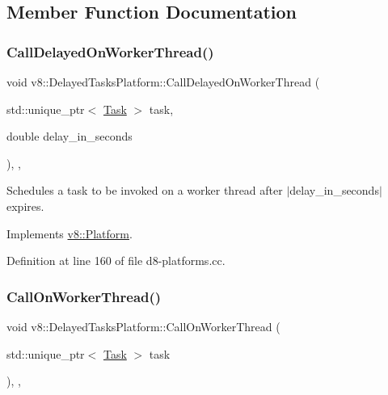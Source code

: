 \subsection{Member Function Documentation}
\mbox{\label{classv8_1_1DelayedTasksPlatform_aeb214faee105e6335c5a93601cac54c7}} 
\subsubsection{\texorpdfstring{Call\+Delayed\+On\+Worker\+Thread()}{CallDelayedOnWorkerThread()}}
{\footnotesize\ttfamily void v8\+::\+Delayed\+Tasks\+Platform\+::\+Call\+Delayed\+On\+Worker\+Thread (\begin{DoxyParamCaption}\item[{std\+::unique\+\_\+ptr$<$ \mbox{\hyperlink{classv8_1_1Task}{Task}} $>$}]{task,  }\item[{double}]{delay\+\_\+in\+\_\+seconds }\end{DoxyParamCaption})\hspace{0.3cm}{\ttfamily [inline]}, {\ttfamily [override]}, {\ttfamily [virtual]}}

Schedules a task to be invoked on a worker thread after $\vert$delay\+\_\+in\+\_\+seconds$\vert$ expires. 

Implements \mbox{\hyperlink{classv8_1_1Platform_a808b0e55ed3efca10ebca031bbd6ecc6}{v8\+::\+Platform}}.



Definition at line 160 of file d8-\/platforms.\+cc.

\mbox{\label{classv8_1_1DelayedTasksPlatform_a9c9cbee600d68caf36aa3c0555ff567f}} 
\subsubsection{\texorpdfstring{Call\+On\+Worker\+Thread()}{CallOnWorkerThread()}}
{\footnotesize\ttfamily void v8\+::\+Delayed\+Tasks\+Platform\+::\+Call\+On\+Worker\+Thread (\begin{DoxyParamCaption}\item[{std\+::unique\+\_\+ptr$<$ \mbox{\hyperlink{classv8_1_1Task}{Task}} $>$}]{task }\end{DoxyParamCaption})\hspace{0.3cm}{\ttfamily [inline]}, {\ttfamily [override]}, {\ttfamily [virtual]}}

